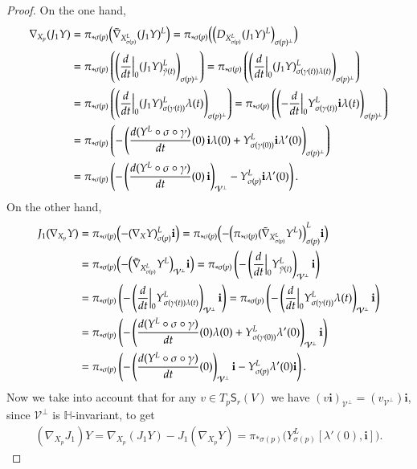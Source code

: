 \documentclass[12pt, a4paper]{amsart}
\renewcommand{\H}{\mathbb{H}}
\theoremstyle{remark}
\begin{document}
\begin{proof}
On the one hand,
\[
\begin{aligned}
\nabla_{X_p}(J_1 Y)
&{}=\pi_{*\sigma(p)}\Bigl(\tilde{\nabla}_{X_{\sigma(p)}^L}(J_1 Y)^L\Bigr)
=\pi_{*\sigma(p)}\Bigl(\Bigl(D_{X_{\sigma(p)}^L}(J_1 Y)^L\Bigr)_{\sigma(p)^\perp}\Bigr)\\
&{}=\pi_{*\sigma(p)}\left(
\left(\frac{d}{dt}\Big\vert_0 (J_1 Y)_{\tilde{\gamma}(t)}^L\right)_{\sigma(p)^\perp}\right)
=\pi_{*\sigma(p)}\left(
\left(\frac{d}{dt}\Big\vert_0 (J_1 Y)_{\sigma(\gamma(t))\lambda(t)}^L\right)_{\sigma(p)^\perp}\right)\\
&{}=\pi_{*\sigma(p)}\left(
\left(\frac{d}{dt}\Big\vert_0 (J_1 Y)_{\sigma(\gamma(t))}^L\lambda(t)\right)_{\sigma(p)^\perp}\right)
=\pi_{*\sigma(p)}\left(
\left(-\frac{d}{dt}\Big\vert_0 Y_{\sigma(\gamma(t))}^L\mathbf{i}\lambda(t)\right)_{\sigma(p)^\perp}\right)\\
&{}=\pi_{*\sigma(p)}\left(
-\left(\frac{d(Y^L\circ\sigma\circ\gamma)}{dt}(0)\,\mathbf{i}\lambda(0) +Y_{\sigma(\gamma(0))}^L\mathbf{i}\lambda'(0)\right)_{\sigma(p)^\perp}\right)\\
&{}=\pi_{*\sigma(p)}\left(
-\left(\frac{d(Y^L\circ\sigma\circ\gamma)}{dt}(0)\,\mathbf{i}\right)_{\mathcal{V}^\perp} -Y_{\sigma(p)}^L\mathbf{i}\lambda'(0)\right).
\end{aligned}
\]
On the other hand,
\[
\begin{aligned}
J_1(\nabla_{X_p}Y)
&{}=\pi_{*\sigma(p)}\Bigl(-(\nabla_X Y)_{\sigma(p)}^L\mathbf{i}\Bigr)
=\pi_{*\sigma(p)}\Bigl(
-\Bigl(\pi_{*\sigma(p)}(\tilde{\nabla}_{X_{\sigma(p)}^L} Y^L)\Bigr)_{\sigma(p)}^L\mathbf{i}\Bigr)\\
&{}=\pi_{*\sigma(p)}\Bigl(
-\Bigl(\tilde{\nabla}_{X_{\sigma(p)}^L} Y^L\Bigr)_{\mathcal{V}^\perp}\mathbf{i}\Bigr)
=\pi_{*\sigma(p)}\left(
-\left(\frac{d}{dt}\Big\vert_0 Y_{\tilde{\gamma}(t)}^L\right)_{\mathcal{V}^\perp}\mathbf{i}\right)\\
&{}=\pi_{*\sigma(p)}\left(
-\left(\frac{d}{dt}\Big\vert_0  Y_{\sigma(\gamma(t))\lambda(t)}^L\right)_{\mathcal{V}^\perp}\mathbf{i}\right)
=\pi_{*\sigma(p)}\left(
-\left(\frac{d}{dt}\Big\vert_0  Y_{\sigma(\gamma(t))}^L\lambda(t)\right)_{\mathcal{V}^\perp}\mathbf{i}\right)\\
&{}=\pi_{*\sigma(p)}\left(
-\left(\frac{d(Y^L\circ\sigma\circ\gamma)}{dt}(0)\lambda(0) +Y_{\sigma(\gamma(0))}^L\lambda'(0)\right)_{\mathcal{V}^\perp}\mathbf{i}\right)\\
&{}=\pi_{*\sigma(p)}\left(
-\left(\frac{d(Y^L\circ\sigma\circ\gamma)}{dt}(0)\right)_{\mathcal{V}^\perp}\mathbf{i} -Y_{\sigma(p)}^L\lambda'(0)\mathbf{i}\right).
\end{aligned}
\]
Now we take into account that for any $v\in T_p\mathsf{S}_r(V)$ we have 
$(v\mathbf{i})_{\mathcal{V}^\perp}=(v_{\mathcal{V}^\perp})\mathbf{i}$, since $\mathcal{V}^\perp$ is $\H$-invariant, to get
\[
\begin{aligned}
(\nabla_{X_p}J_1)Y
=\nabla_{X_p}(J_1 Y)-J_1(\nabla_{X_p}Y)
=\pi_{*\sigma(p)}\bigl(Y_{\sigma(p)}^L[\lambda'(0),\mathbf{i}]\bigr).
\end{aligned}
\]


\end{proof}
\end{document}
